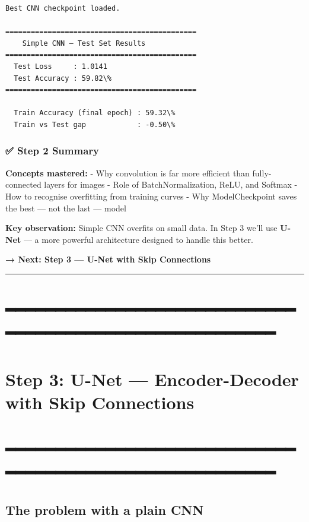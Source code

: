 \documentclass[11pt]{article}
\begin{document}
    \begin{Verbatim}[commandchars=\\\{\}]
Best CNN checkpoint loaded.

=============================================
    Simple CNN — Test Set Results
=============================================
  Test Loss     : 1.0141
  Test Accuracy : 59.82\%
=============================================

  Train Accuracy (final epoch) : 59.32\%
  Train vs Test gap            : -0.50\%
    \end{Verbatim}

    \subsubsection{✅ Step 2 Summary}\label{step-2-summary}

\textbf{Concepts mastered:} - Why convolution is far more efficient than
fully-connected layers for images - Role of BatchNormalization, ReLU,
and Softmax - How to recognise overfitting from training curves - Why
ModelCheckpoint saves the best --- not the last --- model

\textbf{Key observation:} Simple CNN overfits on small data. In Step 3
we'll use \textbf{U-Net} --- a more powerful architecture designed to
handle this better.

\textbf{→ Next: Step 3 --- U-Net with Skip Connections}

    \begin{center}\rule{0.5\linewidth}{0.5pt}\end{center}

\section{━━━━━━━━━━━━━━━━━━━━━━━━━━━━━━━━━━━━━━━━━━━━━━━━━━━━━━━━}\label{section}

\section{Step 3: U-Net --- Encoder-Decoder with Skip
Connections}\label{step-3-u-net-encoder-decoder-with-skip-connections}

\section{━━━━━━━━━━━━━━━━━━━━━━━━━━━━━━━━━━━━━━━━━━━━━━━━━━━━━━━━}\label{section-1}

\subsection{The problem with a plain
CNN}\label{the-problem-with-a-plain-cnn}
\end{document}

